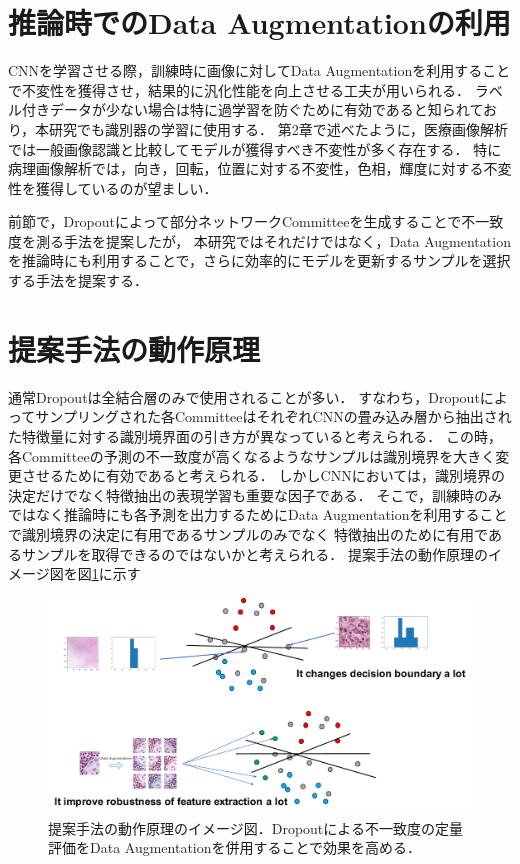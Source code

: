 \section{推論時でのData Augmentationの利用}
CNNを学習させる際，訓練時に画像に対してData Augmentationを利用することで不変性を獲得させ，結果的に汎化性能を向上させる工夫が用いられる．
ラベル付きデータが少ない場合は特に過学習を防ぐために有効であると知られており，本研究でも識別器の学習に使用する．
第2章で述べたように，医療画像解析では一般画像認識と比較してモデルが獲得すべき不変性が多く存在する．
特に病理画像解析では，向き，回転，位置に対する不変性，色相，輝度に対する不変性を獲得しているのが望ましい．

前節で，Dropoutによって部分ネットワークCommitteeを生成することで不一致度を測る手法を提案したが，
本研究ではそれだけではなく，Data Augmentationを推論時にも利用することで，さらに効率的にモデルを更新するサンプルを選択する手法を提案する．

\section{提案手法の動作原理}
通常Dropoutは全結合層のみで使用されることが多い．
すなわち，Dropoutによってサンプリングされた各CommitteeはそれぞれCNNの畳み込み層から抽出された特徴量に対する識別境界面の引き方が異なっていると考えられる．
この時，各Committeeの予測の不一致度が高くなるようなサンプルは識別境界を大きく変更させるために有効であると考えられる．
しかしCNNにおいては，識別境界の決定だけでなく特徴抽出の表現学習も重要な因子である．
そこで，訓練時のみではなく推論時にも各予測を出力するためにData Augmentationを利用することで識別境界の決定に有用であるサンプルのみでなく
特徴抽出のために有用であるサンプルを取得できるのではないかと考えられる．
提案手法の動作原理のイメージ図を図\ref{fig:how_it_works}に示す


\begin{figure}[tbp]
     \begin{center}
      \includegraphics[width=120mm]{figures/how_it_works.pdf}
     \end{center}
    \caption{\label{fig:how_it_works}提案手法の動作原理のイメージ図．Dropoutによる不一致度の定量評価をData Augmentationを併用することで効果を高める．}
\end{figure}


